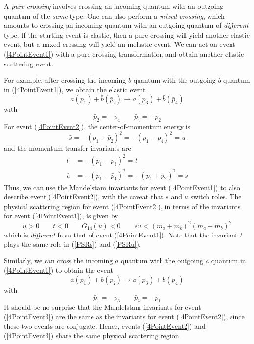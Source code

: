 A \textit{pure crossing} involves crossing an incoming quantum with an outgoing quantum of the \textit{same} type. One can also perform a \textit{mixed crossing}, which amounts to crossing an incoming quantum with an outgoing quantum of \textit{different} type. If the starting event is elastic, then a pure crossing will yield another elastic event, but a mixed crossing will yield an inelastic event. We can act on event (\ref{4PointEvent1}) with a pure crossing transformation and obtain another elastic scattering event. 

For example, after crossing the incoming $b$ quantum with the outgoing $b$ quantum in (\ref{4PointEvent1}), we obtain the elastic event
\begin{equation}
	a(p_{1}) + \bar{b}(\bar{p}_{2}) \longrightarrow a(p_{3}) + \bar{b}(\bar{p}_{4}) \label{4PointEvent2}
\end{equation}
with
\begin{equation}
	\bar{p}_{2} = - p_{4} \qquad \bar{p}_{4} = - p_{2}
\end{equation}
For event (\ref{4PointEvent2}), the center-of-momentum energy is
\begin{equation}
	\bar{s} = -(p_{1} + \bar{p}_{2})^{2} = -(p_{1} - p_{4})^{2} = u
\end{equation}
and the momentum transfer invariants are
\begin{align}
	\bar{t} &= -(p_{1} - p_{3})^{2} = t \\
	\bar{u} &= -(p_{1} - \bar{p}_{4})^{2} = -(p_{1} + p_{2})^{2} = s
\end{align}
Thus, we can use the Mandelstam invariants for event (\ref{4PointEvent1}) to also describe event (\ref{4PointEvent2}), with the caveat that $s$ and $u$ switch roles. The physical scattering region for event (\ref{4PointEvent2}), in terms of the invariants for event (\ref{4PointEvent1}), is given by
\begin{equation}
	u > 0 \qquad t < 0 \qquad G_{14}(u) < 0 \qquad s u < (m_{a} + m_{b})^{2} (m_{a} - m_{b})^{2} \label{PSRu}
\end{equation}
which is \textit{different} from that of event (\ref{4PointEvent1}). Note that the invariant $t$ plays the same role in (\ref{PSRs}) and (\ref{PSRu}).

Similarly, we can cross the incoming $a$ quantum with the outgoing $a$ quantum in (\ref{4PointEvent1}) to obtain the event
\begin{equation}
	\bar{a}(\bar{p}_{1}) + b(p_{2}) \longrightarrow \bar{a}(\bar{p}_{3}) + b(p_{4}) \label{4PointEvent3} 
\end{equation}
with
\begin{equation}
	\bar{p}_{1} = -p_{3} \qquad \bar{p}_{3} = - p_{1}
\end{equation}
It should be no surprise that the Mandelstam invariants for event (\ref{4PointEvent3}) are the same as the invariants for event (\ref{4PointEvent2}), since these two events are conjugate. Hence, events (\ref{4PointEvent2}) and (\ref{4PointEvent3}) share the same physical scattering region.

